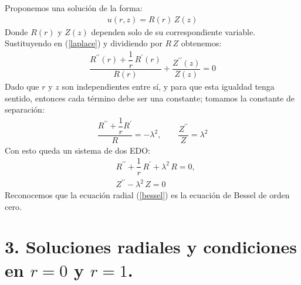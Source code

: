 \documentclass[12pt]{article}
\newcommand{\pderivada}[1]{\ensuremath{{#1}^{\prime}}}
\newcommand{\sderivada}[1]{\ensuremath{{#1}^{\prime \prime}}}
\begin{document}
Proponemos una solución de la forma:
\begin{align*}
    u (r, z) = R (r) \, Z (z)
\end{align*}
Donde $R (r)$ y $Z (z)$ dependen solo de su correspondiente variable. Sustituyendo en (\ref{laplace}) y dividiendo por $R \, Z$ obtenemos:
\begin{align*}
    \dfrac{\sderivada{R} (r) + \dfrac{1}{r} \, \pderivada{R} (r)}{R (r)} + \dfrac{\sderivada{Z} (z)}{Z (z)} = 0
\end{align*}
Dado que $r$ y $z$ son independientes entre sí, y para que esta igualdad tenga sentido, entonces cada término debe ser una constante; tomamos la constante de separación:
\begin{align*}
\dfrac{\sderivada{R}+ \dfrac{1}{r} \pderivada{R}}{R} = -\lambda^{2}, \qquad \dfrac{\sderivada{Z}}{Z} = \lambda^{2}
\end{align*}
Con esto queda un sistema de dos EDO:
\begin{align}
&\sderivada{R} + \dfrac{1}{r} \, \pderivada{R} + \lambda^{2} \, R = 0, \label{bessel} \\[1em]
&\sderivada{Z} - \lambda^{2} \, Z = 0 \label{zode}
\end{align}
Reconocemos que la ecuación radial (\ref{bessel}) es la ecuación de Bessel de orden cero.

\section*{3. Soluciones radiales y condiciones en $r = 0$ y $r = 1$.}
\end{document}
